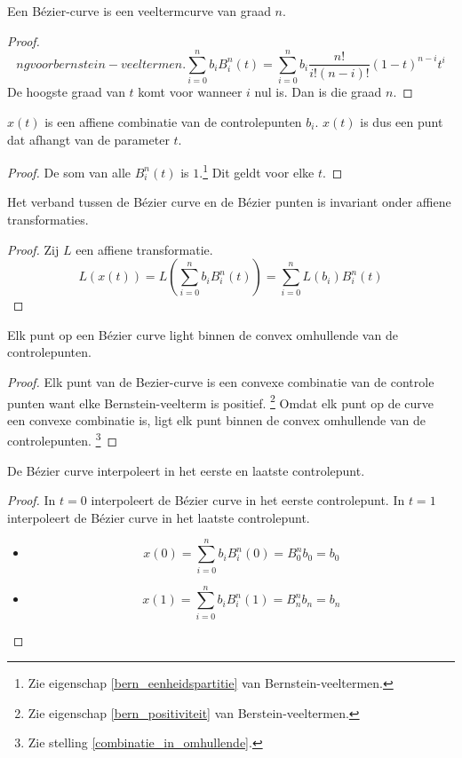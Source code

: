 \documentclass[computergesteund_ontwerp_van_curven_en_oppervlakken.tex]{subfiles}
\begin{document}
\begin{ei}
\label{bezier_veelterm}
Een B\'ezier-curve is een veeltermcurve van graad $n$.
\begin{proof}
\[ng voor bernstein-veeltermen.
\sum_{i=0}^nb_{i}B_{i}^{n}(t) = \sum_{i=0}^nb_i\frac{n!}{i!(n-i)!}(1-t)^{n-i}t^{i}
\]
De hoogste graad van $t$ komt voor wanneer $i$ nul is. Dan is die graad $n$.
\end{proof}
\end{ei}

\begin{ei}
$x(t)$ is een affiene combinatie van de controlepunten $b_i$. $x(t)$ is dus een punt dat afhangt van de parameter $t$.
\begin{proof}
De som van alle $B_{i}^{n}(t)$ is $1$.\footnote{Zie eigenschap \ref{bern_eenheidspartitie} van Bernstein-veeltermen.} Dit geldt voor elke $t$.
\end{proof}
\end{ei}

\begin{ei}
\label{bezier_affien_invariant}
Het verband tussen de B\'ezier curve en de B\'ezier punten is invariant onder affiene transformaties.
\begin{proof}
Zij $L$ een affiene transformatie.
\[
L(x(t))
= L\left( \sum_{i=0}^nb_{i}B_{i}^{n}(t)\right)
= \sum_{i=0}^nL(b_{i})B_{i}^{n}(t)
\]
\end{proof}
\end{ei}

\begin{ei}
\label{bezier_in_convex_omhullende}
Elk punt op een B\'ezier curve light binnen de convex omhullende van de controlepunten.
\begin{proof}
Elk punt van de Bezier-curve is een convexe combinatie van de controle punten want elke Bernstein-veelterm is positief. \footnote{Zie eigenschap \ref{bern_positiviteit} van Berstein-veeltermen.} Omdat elk punt op de curve een convexe combinatie is, ligt elk punt binnen de convex omhullende van de controlepunten. \footnote{Zie stelling \ref{combinatie_in_omhullende}.}
\end{proof}
\end{ei}

\begin{ei}
De B\'ezier curve interpoleert in het eerste en laatste controlepunt.
\begin{proof}
In $t=0$ interpoleert de B\'ezier curve in het eerste controlepunt. In $t=1$ interpoleert de B\'ezier curve in het laatste controlepunt.
\begin{itemize}
\item
\[
x(0) = \sum_{i=0}^nb_{i}B_{i}^{n}(0) = B_{0}^nb_0 = b_0
\]

\item
\[
x(1) = \sum_{i=0}^nb_{i}B_{i}^{n}(1) = B_{n}^nb_n = b_n
\]
\end{itemize}
\end{proof}
\end{ei}
\end{document}
